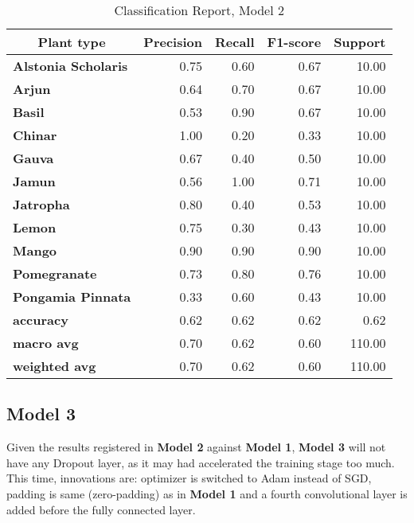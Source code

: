 \documentclass[11pt]{article}
\begin{document}
\begin{table}[H]
\centering

\begin{tabular}{lrrrr}
\toprule
\multicolumn{1}{c}{\textbf{Plant type}} & \multicolumn{1}{c}{\textbf{Precision}} & \multicolumn{1}{c}{\textbf{Recall}} & \multicolumn{1}{c}{\textbf{F1-score}} & \multicolumn{1}{c}{\textbf{Support}}\\
\midrule
\textbf{Alstonia Scholaris} &       0.75 &    0.60 &      0.67 &    10.00 \\
\textbf{Arjun             } &       0.64 &    0.70 &      0.67 &    10.00 \\
\textbf{Basil             } &       0.53 &    0.90 &      0.67 &    10.00 \\
\textbf{Chinar            } &       1.00 &    0.20 &      0.33 &    10.00 \\
\textbf{Gauva             } &       0.67 &    0.40 &      0.50 &    10.00 \\
\textbf{Jamun             } &       0.56 &    1.00 &      0.71 &    10.00 \\
\textbf{Jatropha          } &       0.80 &    0.40 &      0.53 &    10.00 \\
\textbf{Lemon             } &       0.75 &    0.30 &      0.43 &    10.00 \\
\textbf{Mango             } &       0.90 &    0.90 &      0.90 &    10.00 \\
\textbf{Pomegranate       } &       0.73 &    0.80 &      0.76 &    10.00 \\
\textbf{Pongamia Pinnata  } &       0.33 &    0.60 &      0.43 &    10.00 \\ \hline
\textbf{accuracy          } &       0.62 &    0.62 &      0.62 &     0.62 \\
\textbf{macro avg         } &       0.70 &    0.62 &      0.60 &   110.00 \\
\textbf{weighted avg      } &       0.70 &    0.62 &      0.60 &   110.00 \\ 
\bottomrule
\end{tabular}
\caption{Classification Report, Model 2}\label{tab:report_model2}
\end{table}


\subsection{Model 3}

Given the results registered in \textbf{Model 2} against \textbf{Model 1}, \textbf{Model 3} will not have any Dropout layer, as it may had accelerated the training stage too much. This time, innovations are: optimizer is switched to Adam instead of SGD, padding is same (zero-padding) as in \textbf{Model 1} and a fourth convolutional layer is added before the fully connected layer.
\end{document}
